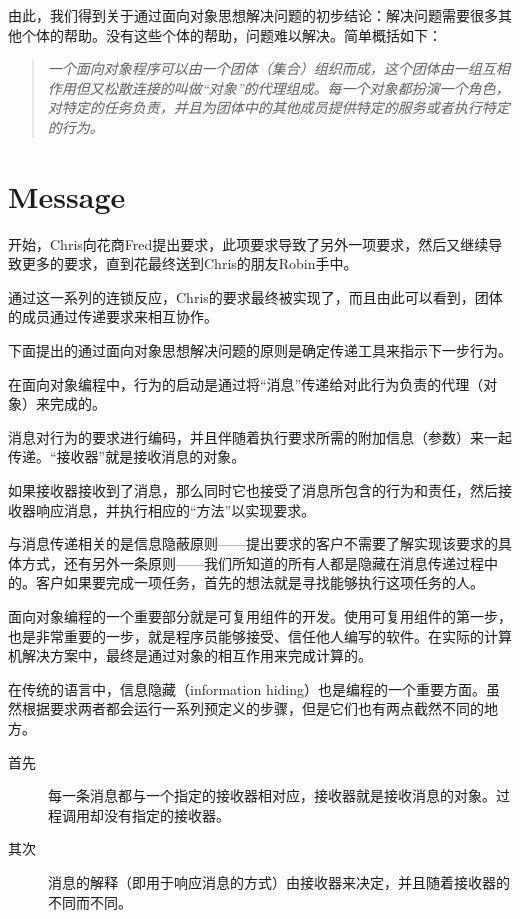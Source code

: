 由此，我们得到关于通过面向对象思想解决问题的初步结论：解决问题需要很多其他个体的帮助。没有这些个体的帮助，问题难以解决。简单概括如下：

\begin{quote}
\emph{一个面向对象程序可以由一个团体（集合）组织而成，这个团体由一组互相作用但又松散连接的叫做“对象”的代理组成。每一个对象都扮演一个角色，对特定的任务负责，并且为团体中的其他成员提供特定的服务或者执行特定的行为。}
\end{quote}



\section{Message}

开始，Chris向花商Fred提出要求，此项要求导致了另外一项要求，然后又继续导致更多的要求，直到花最终送到Chris的朋友Robin手中。

通过这一系列的连锁反应，Chris的要求最终被实现了，而且由此可以看到，团体的成员通过传递要求来相互协作。

下面提出的通过面向对象思想解决问题的原则是确定传递工具来指示下一步行为。


在面向对象编程中，行为的启动是通过将“消息”传递给对此行为负责的代理（对象）来完成的。

消息对行为的要求进行编码，并且伴随着执行要求所需的附加信息（参数）来一起传递。“接收器”就是接收消息的对象。

如果接收器接收到了消息，那么同时它也接受了消息所包含的行为和责任，然后接收器响应消息，并执行相应的“方法”以实现要求。

与消息传递相关的是信息隐蔽原则——提出要求的客户不需要了解实现该要求的具体方式，还有另外一条原则——我们所知道的所有人都是隐藏在消息传递过程中的。客户如果要完成一项任务，首先的想法就是寻找能够执行这项任务的人。


面向对象编程的一个重要部分就是可复用组件的开发。使用可复用组件的第一步，也是非常重要的一步，就是程序员能够接受、信任他人编写的软件。在实际的计算机解决方案中，最终是通过对象的相互作用来完成计算的。

在传统的语言中，信息隐藏（information hiding）也是编程的一个重要方面。虽然根据要求两者都会运行一系列预定义的步骤，但是它们也有两点截然不同的地方。

\begin{description}
\item[首先] 每一条消息都与一个指定的接收器相对应，接收器就是接收消息的对象。过程调用却没有指定的接收器。
\item[其次] 消息的解释（即用于响应消息的方式）由接收器来决定，并且随着接收器的不同而不同。
\end{description}


